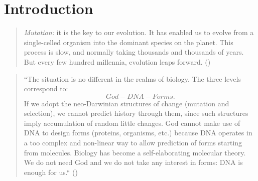 \section{Introduction}
\begin{quote}
\emph{Mutation:} it is the key to our evolution. It has enabled us to evolve from a single-celled organism into the dominant species on the planet. This process is slow, and normally taking thousands and thousands of years. But every few hundred millennia, evolution leaps forward. (\cite{XMen})
\end{quote}

\blindtext

\begin{quote}
``The situation is no different in the realms of biology. The three
levels correspond to:
\begin{equation*}
God - DNA - Forms.
\end{equation*}
If we adopt the neo-Darwinian structures of change (mutation and selection), we
cannot predict history through them, since such structures imply accumulation
of random little changes. God cannot make use of DNA to design forms (proteins,
organisms, etc.) because DNA operates in a too complex and non-linear way to
allow prediction of forms starting from molecules. Biology has become a
self-elaborating molecular theory. We do not need God and we do not take any
interest in forms: DNA is enough for us.`` (\cite{Sermonti2006})
\end{quote}
